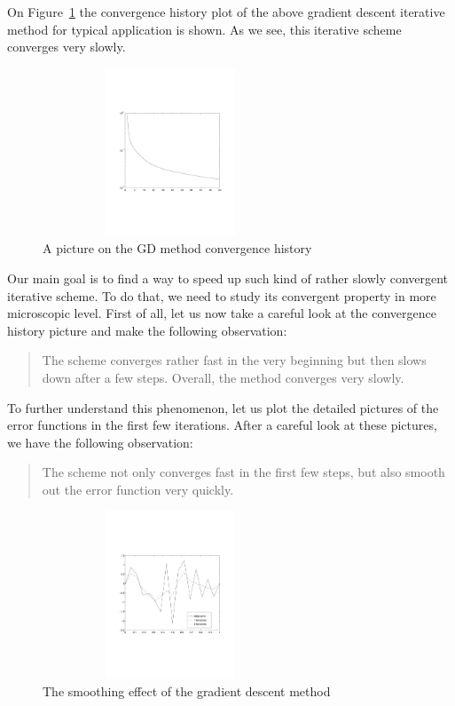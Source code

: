 On Figure~\ref{fig:richardson} the convergence history plot of the
above gradient descent iterative method for typical application is shown.
As we see, this iterative scheme converges very slowly.

\begin{figure}[!htb]
\begin{center}
\includegraphics[height=5cm,width=3in]{pictures/richardson.pdf}
\end{center}
\caption{A picture on the GD method convergence history
\label{fig:richardson}}
\end{figure}

Our main goal is to find a way to speed up such kind of rather slowly
convergent iterative scheme.  To do that, we need to study its
convergent property in more microscopic level.  First of all, let us
now take a careful look at the convergence history picture and make
the following observation:
\begin{quote}
  The scheme converges rather fast in the
very beginning but then slows down after a few steps. Overall, the method 
converges very slowly. 
\end{quote}
To further understand this phenomenon, let us plot the detailed
pictures of the error functions in the first few iterations.
After a careful look at these pictures, we have the following 
observation:
\begin{quote}
 The scheme not only converges fast in the
first few steps, but also smooth out the error function very quickly.
\end{quote}

\begin{figure}[!htb]
\begin{center}
\includegraphics[height=5cm,width=3in]{pictures/smoothing.pdf}
\end{center}
\caption{The smoothing effect of the gradient descent method
\label{fig:smoothing}}
\end{figure}


